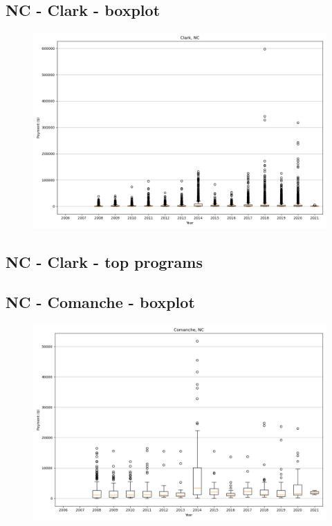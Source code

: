 \subsection*{NC - Clark - boxplot}
\begin{figure}[h]
\centering
\includegraphics[width=7in]{../output/boxplots/counties/Clark-NC_boxplot.png}
\end{figure}


\subsection*{NC - Clark - top programs}

\newpage
\subsection*{NC - Comanche - boxplot}
\begin{figure}[h]
\centering
\includegraphics[width=7in]{../output/boxplots/counties/Comanche-NC_boxplot.png}
\end{figure}


